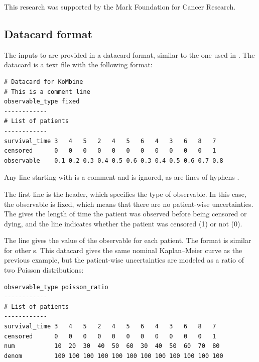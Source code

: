 \documentclass[article]{jss}
\newcommand{\KM}{Kaplan--Meier} %
\begin{document}
This research was supported by the Mark Foundation for Cancer Research.






\newpage

\begin{appendix}

\section{Datacard format}\label{app:datacard}

The inputs to  are provided in a datacard format, similar to the one used in  \citep{CAT-23-001}. The datacard is a text file with the following format:
\begin{verbatim}
# Datacard for KoMbine
# This is a comment line
observable_type fixed
------------
# List of patients
------------
survival_time 3   4   5   2   4   5   6   4   3   6   8   7
censored      0   0   0   0   0   0   0   0   0   0   0   1
observable    0.1 0.2 0.3 0.4 0.5 0.6 0.3 0.4 0.5 0.6 0.7 0.8
\end{verbatim}
\end{appendix}
Any line starting with \code{\#} is a comment and is ignored, as are lines of hyphens \code{------------}.

The first line is the header, which specifies the type of observable. In this case, the observable is fixed, which means that there are no patient-wise uncertainties. The  gives the length of time the patient was observed before being censored or dying, and the  line indicates whether the patient was censored (1) or not (0).

The  line gives the value of the observable for each patient. The format is similar for other s. This datacard gives the same nominal \KM{} curve as the previous example, but the patient-wise uncertainties are modeled as a ratio of two Poisson distributions:
\begin{verbatim}
observable_type poisson_ratio
------------
# List of patients
------------
survival_time 3   4   5   2   4   5   6   4   3   6   8   7
censored      0   0   0   0   0   0   0   0   0   0   0   1
num           10  20  30  40  50  60  30  40  50  60  70  80
denom         100 100 100 100 100 100 100 100 100 100 100 100
\end{verbatim}
\end{document}
